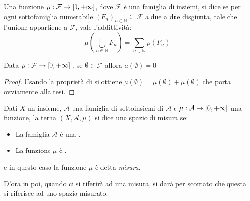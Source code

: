 \begin{definition}[{\sigadd[ità]}]
	Una funzione $\mu:\mathcal F\to [0,+\infty]$, dove $\mathcal F$ è una famiglia di insiemi, si dice \sigadd{} se per ogni sottofamiglia numerabile $(F_n)_{n\in\mathbb N}\subseteq \mathcal F$ a due a due disgiunta, tale che l'unione appartiene a $\mathcal F$, vale l'addittività:
	\begin{equation*}
		\mu\left(\bigcup_{n\in\mathbb N}F_n \right)=\sum_{n\in\mathbb N} \mu(F_n) 
	\end{equation*}
\end{definition}
\begin{remark}
	Data $\mu:\mathcal F\to [0,+\infty]$ \sigadd{}, se $\emptyset\in \mathcal F$ allora $\mu(\emptyset)=0$
\end{remark}
\begin{proof}
	Usando la proprietà di \sigadd[ità] si ottiene $\mu(\emptyset)=\mu(\emptyset)+\mu(\emptyset)$ che porta ovviamente alla tesi.
\end{proof}


\begin{definition}
	Dati $X$ un insieme, $\mathcal A$ una famiglia di sottoinsiemi di $\mathcal A$ e $\mu:\mathcal A\to [0,+\infty]$ una funzione, la terna $(X,\mathcal A, \mu)$ si dice uno spazio di misura se:
	\begin{itemize}
		\item La famiglia $\mathcal A$ è una \sigalg{}.
		\item La funzione $\mu$ è \sigadd{}.
	\end{itemize}
	e in questo caso la funzione $\mu$ è detta \emph{misura}.
\end{definition}

D'ora in poi, quando ci si riferirà ad una misura, si darà per scontato che questa si riferisce ad uno spazio misurato.

